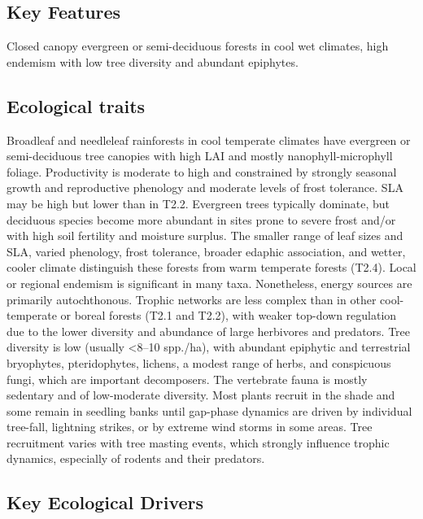 \documentclass[
  letterpaper,
  DIV=11,
  numbers=noendperiod]{scrartcl}
\begin{document}
\subsection{Key Features}\label{key-features-75}

Closed canopy evergreen or semi-deciduous forests in cool wet climates,
high endemism with low tree diversity and abundant epiphytes.

\subsection{Ecological traits}\label{ecological-traits-75}

Broadleaf and needleleaf rainforests in cool temperate climates have
evergreen or semi-deciduous tree canopies with high LAI and mostly
nanophyll-microphyll foliage. Productivity is moderate to high and
constrained by strongly seasonal growth and reproductive phenology and
moderate levels of frost tolerance. SLA may be high but lower than in
T2.2. Evergreen trees typically dominate, but deciduous species become
more abundant in sites prone to severe frost and/or with high soil
fertility and moisture surplus. The smaller range of leaf sizes and SLA,
varied phenology, frost tolerance, broader edaphic association, and
wetter, cooler climate distinguish these forests from warm temperate
forests (T2.4). Local or regional endemism is significant in many taxa.
Nonetheless, energy sources are primarily autochthonous. Trophic
networks are less complex than in other cool-temperate or boreal forests
(T2.1 and T2.2), with weaker top-down regulation due to the lower
diversity and abundance of large herbivores and predators. Tree
diversity is low (usually \textless8--10 spp./ha), with abundant
epiphytic and terrestrial bryophytes, pteridophytes, lichens, a modest
range of herbs, and conspicuous fungi, which are important decomposers.
The vertebrate fauna is mostly sedentary and of low-moderate diversity.
Most plants recruit in the shade and some remain in seedling banks until
gap-phase dynamics are driven by individual tree-fall, lightning
strikes, or by extreme wind storms in some areas. Tree recruitment
varies with tree masting events, which strongly influence trophic
dynamics, especially of rodents and their predators.

\subsection{Key Ecological Drivers}\label{key-ecological-drivers-75}
\end{document}
